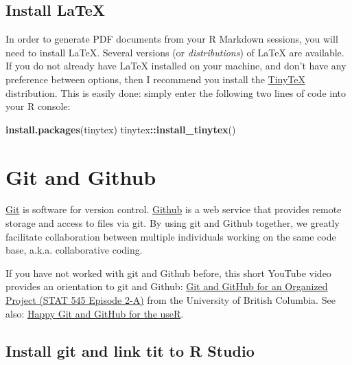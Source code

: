 \documentclass[
]{book}
\newenvironment{Shaded}{\begin{snugshade}}{\end{snugshade}}
\newcommand{\KeywordTok}[1]{\textcolor[rgb]{0.13,0.29,0.53}{\textbf{#1}}}
\newcommand{\NormalTok}[1]{#1}
\newcommand{\OperatorTok}[1]{\textcolor[rgb]{0.81,0.36,0.00}{\textbf{#1}}}
\newcommand{\StringTok}[1]{\textcolor[rgb]{0.31,0.60,0.02}{#1}}
\begin{document}
\hypertarget{install-latex}{%
\subsection{Install LaTeX}\label{install-latex}}

In order to generate PDF documents from your R Markdown sessions, you will need to install LaTeX. Several versions (or \emph{distributions}) of LaTeX are available. If you do not already have LaTeX installed on your machine, and don't have any preference between options, then I recommend you install the \href{https://yihui.org/tinytex/}{TinyTeX} distribution. This is easily done: simply enter the following two lines of code into your R console:

\begin{Shaded}
\begin{Highlighting}[]
\KeywordTok{install.packages}\NormalTok{(}\StringTok{\textquotesingle{}tinytex\textquotesingle{}}\NormalTok{)}
\NormalTok{tinytex}\OperatorTok{::}\KeywordTok{install\_tinytex}\NormalTok{()}
\end{Highlighting}
\end{Shaded}

\hypertarget{git-and-github}{%
\section{Git and Github}\label{git-and-github}}

\href{https://git-scm.com/}{Git} is software for version control. \href{https://github.com/}{Github} is a web service that provides remote storage and access to files via git. By using git and Github together, we greatly facilitate collaboration between multiple individuals working on the same code base, a.k.a. collaborative coding.

If you have not worked with git and Github before, this short YouTube video provides an orientation to git and Github: \href{https://www.youtube.com/watch?v=l2ftm-YwJs8}{Git and GitHub for an Organized Project (STAT 545 Episode 2-A)} from the University of British Columbia. See also: \href{https://happygitwithr.com/}{Happy Git and GitHub for the useR}.

\hypertarget{install-git-and-link-tit-to-r-studio}{%
\subsection{Install git and link tit to R Studio}\label{install-git-and-link-tit-to-r-studio}}
\end{document}
